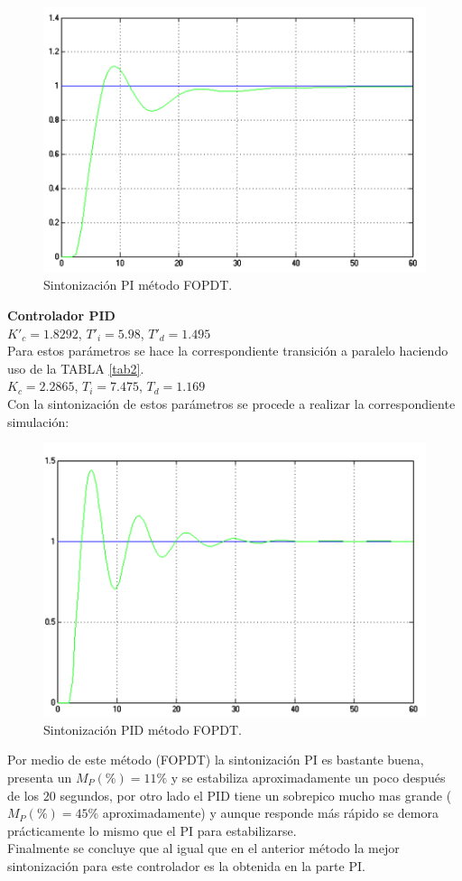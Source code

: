 \documentclass[twocolumn]{IEEEtran}
\begin{document}
\begin{figure}[H]
	\centering
		\includegraphics[scale=0.28]{3.png}
	\caption{Sintonización PI método FOPDT.}
	\label{fig003}
\end{figure}
\noindent
\textbf{Controlador PID}\\
$K'_c=1.8292$, $T'_i=5.98$, $T'_d=1.495$\\
Para estos parámetros se hace la correspondiente transición a paralelo haciendo uso de la TABLA \ref{tab2}.\\
$K_c=2.2865$, $T_i=7.475$, $T_d=1.169$\\
Con la sintonización de estos parámetros se procede a realizar la correspondiente simulación:
\begin{figure}[H]
	\centering
		\includegraphics[scale=0.25]{4.png}
	\caption{Sintonización PID método FOPDT.}
	\label{fig004}
\end{figure}
\noindent
Por medio de este método (FOPDT) la sintonización PI es bastante buena, presenta un $M_P(\%)= 11\%$ y se estabiliza aproximadamente un poco después de  los $20$ segundos, por otro lado el PID tiene un sobrepico mucho mas grande ($M_P(\%)= 45\%$ aproximadamente) y aunque responde más rápido se demora prácticamente lo mismo que el PI para estabilizarse.\\
Finalmente se concluye que al igual que en el anterior método la mejor sintonización para este controlador es la obtenida en la parte PI.
\end{document}

